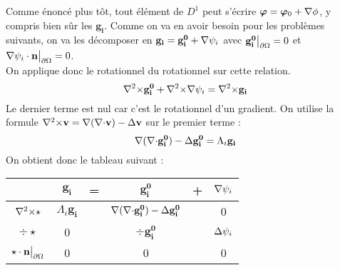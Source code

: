 Comme énoncé plus tôt, tout élément de $D^1$ peut s'écrire $\bm{\varphi} = \bm{\varphi}_0 + {\nabla}\phi$, y compris bien sûr les $\mathbf{g_i}$. Comme on va en avoir besoin pour les problèmes suivants, on va les décomposer en $\mathbf{g_i}=\mathbf{g_i^0}+{\nabla}\psi_i$ avec $\mathbf{g_i^0}{\big\rvert_{\partial\Omega}} = 0$ et ${\nabla}\psi_i\cdot \mathbf{n}{\big\rvert_{\partial\Omega}} = 0$.\\
On applique donc le rotationnel du rotationnel sur cette relation.\\
\[ {\nabla^2\times} \mathbf{g_i^0} +{\nabla^2\times}{\nabla}\psi_i = {\nabla^2\times} \mathbf{g_i} \]
Le dernier terme est nul car c'est le rotationnel d'un gradient. On utilise la formule ${\nabla^2\times} \mathbf{v}={\nabla}({\nabla\cdot} \mathbf{v})-{\Delta} \mathbf{v}$ sur le premier terme :
\[ {\nabla}({\nabla\cdot} \mathbf{g_i^0})-{\Delta} \mathbf{g_i^0} = \Lambda_i \mathbf{g_i} \]
On obtient donc le tableau suivant :
\begin{center}
\begin{tabular}{c|ccccc}
& $\mathbf{g_i}$ & = & $\mathbf{g_i^0}$ & + & ${\nabla}\psi_i$ \\ \hline
${\nabla^2\times}\star$ & $\Lambda_i\mathbf{g_i}$ & & ${\nabla}({\nabla\cdot} \mathbf{g_i^0})-{\Delta} \mathbf{g_i^0}$ & & 0\\ \hline
$\div\star$ & 0 & & $\div \mathbf{g_i^0}$ & & ${\Delta}\psi_i$\\ \hline
$\star\cdot \mathbf{n}{\big\rvert_{\partial\Omega}}$ & 0 & & 0 & & 0
\end{tabular}
\end{center}

